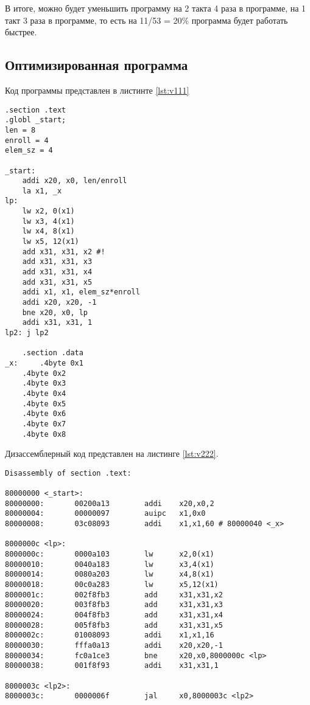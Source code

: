 В итоге, можно будет уменьшить программу на 2 такта 4 раза в программе, на 1 такт 3 раза в программе, то есть на 11/53 = 20\% программа будет работать быстрее.

\clearpage


\subsection*{Оптимизированная программа}

Код программы представлен в листинте \ref{lst:v111}

\begin{lstlisting}[label=lst:v111,caption=Код программы 9 варианта(оптимизированный)]
        .section .text
.globl _start;
len = 8
enroll = 4 
elem_sz = 4 

_start:
	addi x20, x0, len/enroll
	la x1, _x
lp:
	lw x2, 0(x1)
	lw x3, 4(x1)
	lw x4, 8(x1)
	lw x5, 12(x1)
	add x31, x31, x2 #!
	add x31, x31, x3
	add x31, x31, x4
	add x31, x31, x5
	addi x1, x1, elem_sz*enroll
	addi x20, x20, -1
	bne x20, x0, lp
	addi x31, x31, 1
lp2: j lp2

	.section .data
_x:     .4byte 0x1
	.4byte 0x2
	.4byte 0x3
	.4byte 0x4
	.4byte 0x5
	.4byte 0x6
	.4byte 0x7
	.4byte 0x8
\end{lstlisting}

\clearpage

Дизассемблерный код представлен на листинге \ref{lst:v222}.

\begin{lstlisting}[label=lst:v222,caption=Дизассемблированный код 9 варинта (оптимизированный)]
Disassembly of section .text:

80000000 <_start>:
80000000:       00200a13        addi    x20,x0,2
80000004:       00000097        auipc   x1,0x0
80000008:       03c08093        addi    x1,x1,60 # 80000040 <_x>

8000000c <lp>:
8000000c:       0000a103        lw      x2,0(x1)
80000010:       0040a183        lw      x3,4(x1)
80000014:       0080a203        lw      x4,8(x1)
80000018:       00c0a283        lw      x5,12(x1)
8000001c:       002f8fb3        add     x31,x31,x2
80000020:       003f8fb3        add     x31,x31,x3
80000024:       004f8fb3        add     x31,x31,x4
80000028:       005f8fb3        add     x31,x31,x5
8000002c:       01008093        addi    x1,x1,16
80000030:       fffa0a13        addi    x20,x20,-1
80000034:       fc0a1ce3        bne     x20,x0,8000000c <lp>
80000038:       001f8f93        addi    x31,x31,1

8000003c <lp2>:
8000003c:       0000006f        jal     x0,8000003c <lp2>
\end{lstlisting}
\clearpage

